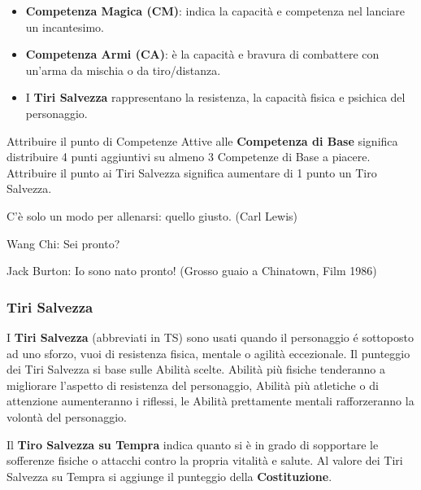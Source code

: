 \begin{multicols}{2}
\begin{itemize}[leftmargin=*]
\item \textbf{Competenza Magica (CM)}:  indica la capacità e competenza nel lanciare un incantesimo.

\item \textbf{Competenza Armi (CA)}:  è la capacità e bravura di combattere con un'arma da mischia o da tiro/distanza.

\item I \textbf{Tiri Salvezza} rappresentano la resistenza, la capacità fisica e psichica del personaggio.
\end{itemize}

Attribuire il punto di Competenze Attive alle \textbf{Competenza di Base} significa distribuire 4 punti aggiuntivi su almeno 3 Competenze di Base a piacere. Attribuire il punto ai Tiri Salvezza significa aumentare di 1 punto un Tiro Salvezza.

\medskip

\begin{changemargin}{0.3cm}{0.3cm}\begin{enfasi}{C'è solo un modo per allenarsi: quello giusto. (Carl Lewis)
\medskip

Wang Chi: Sei pronto?

Jack Burton: Io sono nato pronto! (Grosso guaio a Chinatown, Film 1986)
}\end{enfasi}\end{changemargin}

\subsubsection{Tiri Salvezza}\label{tirisavellza}

I \textbf{Tiri Salvezza} (abbreviati in TS) sono usati quando il personaggio é sottoposto ad uno sforzo, vuoi di resistenza fisica, mentale o agilità eccezionale. Il punteggio dei Tiri Salvezza si base sulle Abilità scelte. Abilità più fisiche tenderanno a migliorare l'aspetto di resistenza del personaggio, Abilità più atletiche o di attenzione aumenteranno i riflessi, le Abilità prettamente mentali rafforzeranno la volontà del personaggio.

Il \textbf{Tiro Salvezza su Tempra} indica quanto si è in grado di sopportare le sofferenze fisiche o attacchi contro la propria vitalità e salute. Al valore dei Tiri Salvezza su Tempra si aggiunge il punteggio della \textbf{Costituzione}.


\end{multicols}
